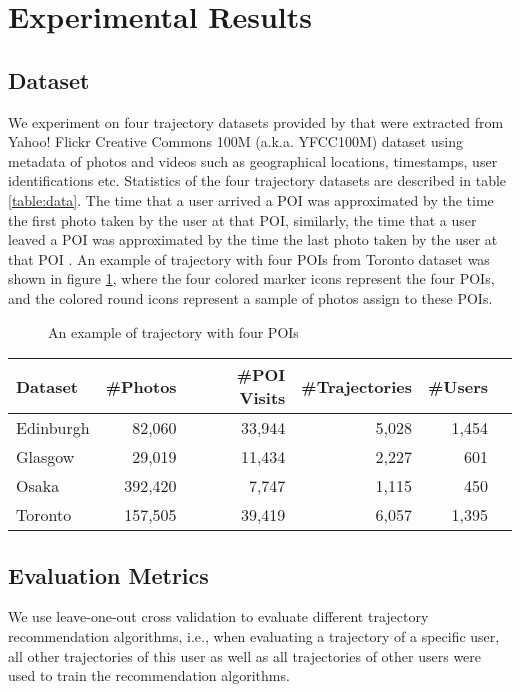 \section{Experimental Results}
\label{experiment}

\subsection{Dataset}
\label{experiment:dataset}
We experiment on four trajectory datasets provided by \cite{ijcai15} that were
extracted from Yahoo! Flickr Creative Commons 100M (a.k.a. YFCC100M) dataset\cite{yfcc100m} 
using metadata of photos and videos such as geographical locations, timestamps, user identifications etc.
Statistics of the four trajectory datasets are described in table \ref{table:data}.
%
The time that a user arrived a POI was approximated by the time the first photo taken by the user at that POI,
similarly, the time that a user leaved a POI was approximated by the time the last photo taken by the user at 
that POI \cite{ht10, ijcai15}.
An example of trajectory with four POIs from Toronto dataset was shown in figure \ref{fig:traj}, 
where the four colored marker icons represent the four POIs, 
and the colored round icons represent a sample of photos assign to these POIs.


\begin{figure}
\centering
{}
\caption{An example of trajectory with four POIs}
\label{fig:traj}
\end{figure}

\begin{table*}
\centering
\begin{tabular}{lrrrrr} \hline
\textbf{Dataset} & \textbf{\#Photos} & \textbf{\#POI Visits} & \textbf{\#Trajectories} & \textbf{\#Users} \\ \hline
Edinburgh & 82,060 & 33,944 & 5,028 & 1,454 \\ 
Glasgow & 29,019 & 11,434 & 2,227 & 601 \\ 
Osaka & 392,420 & 7,747 & 1,115 & 450 \\ 
Toronto & 157,505 & 39,419 & 6,057 & 1,395 \\ 
\hline
\end{tabular}
\caption{Statistics of trajectory dataset}
\label{table:data}
\end{table*}


\subsection{Evaluation Metrics}
\label{experiment:metric}
We use leave-one-out cross validation to evaluate different trajectory recommendation algorithms,
i.e., when evaluating a trajectory of a specific user, all other trajectories of this user as well as 
all trajectories of other users were used to train the recommendation algorithms.

